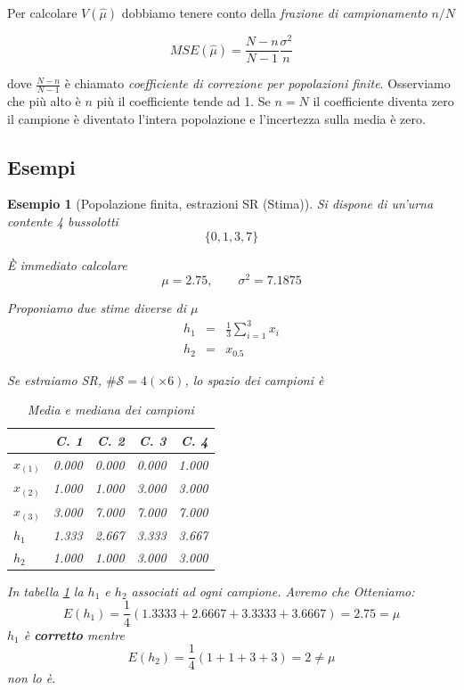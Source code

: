 \documentclass[
  11pt,
]{book}
\theoremstyle{mytheoremstyle}
\theoremstyle{mydefstyle}
\newtheorem{example}{{Esempio}}[section]
\begin{document}
Per calcolare \(V(\hat \mu)\) dobbiamo tenere conto della \emph{frazione di campionamento} \(n/N\)

\begin{info}
\[
MSE(\hat \mu)=\frac{N-n}{N-1}\frac{\sigma^2} n
\]

\end{info}

dove \(\frac{N-n}{N-1}\) è chiamato \emph{coefficiente di correzione per popolazioni finite}.
Osserviamo che più alto è \(n\) più il coefficiente tende ad 1.
Se \(n = N\) il coefficiente diventa zero il campione è diventato l'intera popolazione e
l'incertezza sulla media è zero.

\subsection{Esempi}\label{esempi-1}

\begin{example}[Popolazione finita, estrazioni SR (Stima)]
Si dispone di un'urna contente 4 bussolotti
\[\{0,1,3,7\}\]

È immediato calcolare
\[\mu=2.75, \qquad \sigma^2=7.1875 \]

Proponiamo due stime diverse di \(\mu\)
\begin{eqnarray*}
h_1 &=& \frac 1 3 \sum_{i=1}^3 x_i\\
h_2 &=& x_{0.5}
\end{eqnarray*}

Se estraiamo SR, \(\#\mathcal{S}=4(\times 6)\), lo spazio dei campioni è

\begin{table}[!h]
\centering
\caption{\label{tab:stima-sr}Media e mediana dei campioni}
\centering
\fontsize{8}{10}\selectfont
\begin{tabular}[t]{>{}l|>{}r|>{}r|>{}r|r}
\toprule
  & C. 1 & C. 2 & C. 3 & C. 4\\
\midrule
$x_{(1)}$ & 0.000 & 0.000 & 0.000 & 1.000\\
$x_{(2)}$ & 1.000 & 1.000 & 3.000 & 3.000\\
$x_{(3)}$ & 3.000 & 7.000 & 7.000 & 7.000\\
\textcolor[HTML]{012D50}{$h_1$} & \textcolor[HTML]{012D50}{1.333} & \textcolor[HTML]{012D50}{2.667} & \textcolor[HTML]{012D50}{3.333} & \textcolor[HTML]{012D50}{3.667}\\
\midrule
\textcolor[HTML]{012D50}{$h_2$} & \textcolor[HTML]{012D50}{1.000} & \textcolor[HTML]{012D50}{1.000} & \textcolor[HTML]{012D50}{3.000} & \textcolor[HTML]{012D50}{3.000}\\
\midrule
\bottomrule
\end{tabular}
\end{table}

In tabella \ref{tab:stima-sr} la \(h_1\) e \(h_2\) associati ad ogni campione. Avremo che
Otteniamo:
\[E(h_1)=\frac 1{4}(1.3333+2.6667+3.3333+3.6667)=2.75=\mu\]
\(h_1\) è \textbf{corretto}
mentre
\[E(h_2)=\frac 1{4}(1+1+3+3)=2\neq\mu\]
non lo è.
\end{example}
\end{document}
